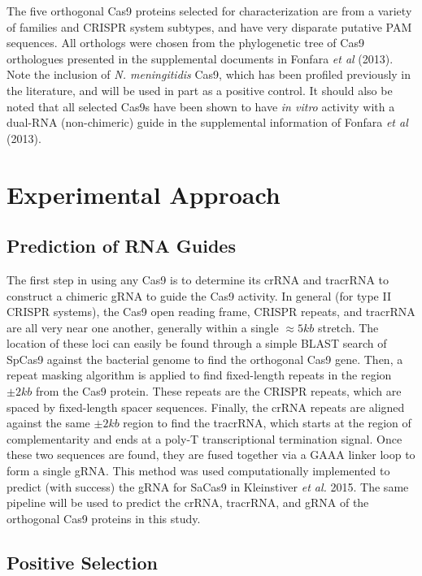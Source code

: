 The five orthogonal Cas9 proteins selected for characterization are from a variety of families and CRISPR system subtypes, and have very disparate putative PAM sequences. All orthologs were chosen from the phylogenetic tree of Cas9 orthologues presented in the supplemental documents in  Fonfara \textit{et al} (2013). Note the inclusion of \textit{N. meningitidis} Cas9, which has been profiled previously in the literature, and will be used in part as a positive control. It should also be noted that all selected Cas9s have been shown to have \textit{in vitro} activity with a dual-RNA (non-chimeric) guide in the supplemental information of Fonfara \textit{et al} (2013).


\section{Experimental Approach}

\subsection{Prediction of RNA Guides}
The first step in using any Cas9 is to determine its crRNA and tracrRNA to construct a chimeric gRNA to guide the Cas9 activity. In general (for type II CRISPR systems), the Cas9 open reading frame, CRISPR repeats, and tracrRNA are all very near one another, generally within a single $\approx 5kb$ stretch. The location of these loci can easily be found through a simple BLAST search of SpCas9 against the bacterial genome to find the orthogonal Cas9 gene. Then, a repeat masking algorithm is applied to find fixed-length repeats in the region $\pm 2kb$ from the Cas9 protein. These repeats are the CRISPR repeats, which are spaced by fixed-length spacer sequences. Finally, the crRNA repeats are aligned against the same $\pm 2kb$ region to find the tracrRNA, which starts at the region of complementarity and ends at a poly-T transcriptional termination signal. Once these two sequences are found, they are fused together via a GAAA linker loop to form a single gRNA. This method was used computationally implemented to predict (with success) the gRNA for SaCas9 in Kleinstiver \textit{et al.} 2015. The same pipeline will be used to predict the crRNA, tracrRNA, and gRNA of the orthogonal Cas9 proteins in this study.



\subsection{Positive Selection}

